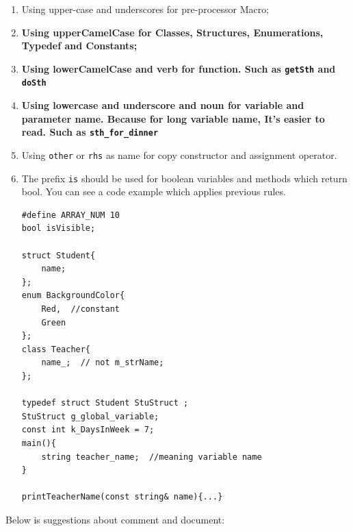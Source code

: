 \documentclass[a4paper,11pt,twoside]{book}
\begin{document}
\begin{itemize}
\begin{enumerate}
	\item Using upper-case and underscores for pre-processor Macro;
	
	\item \textbf{Using upperCamelCase for Classes, Structures, Enumerations, Typedef and  Constants;}
	
	\item \textbf{Using lowerCamelCase and verb for function. Such as \texttt{getSth} and \texttt{doSth}}
	
	\item \textbf{Using lowercase and underscore  and noun for variable and parameter name. Because for long variable name, It's easier to read. Such as \texttt{sth\_for\_dinner}}
	
	\item Using \texttt{other} or \texttt{rhs} as name for copy constructor and assignment operator.
	
	\item The prefix \texttt{is} should be used for boolean variables and methods which return bool. You can see a code example which applies previous rules.
	
\begin{lstlisting}[numbers=none]
#define ARRAY_NUM 10
bool isVisible;

struct Student{
	name;
};
enum BackgroundColor{
	Red,  //constant
	Green
};
class Teacher{
	name_;  // not m_strName;  
};

typedef struct Student StuStruct ;
StuStruct g_global_variable;
const int k_DaysInWeek = 7;
main(){
	string teacher_name;  //meaning variable name
}

printTeacherName(const string& name){...}
\end{lstlisting}
\end{enumerate}


\end{itemize}

Below is suggestions about comment and document:
\end{document}
